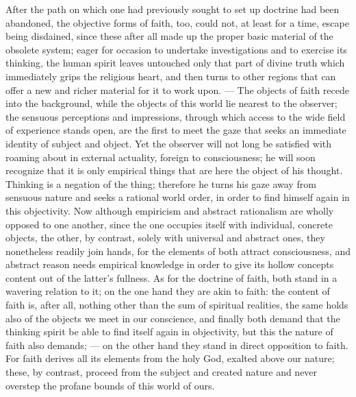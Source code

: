\documentclass[12pt]{book}
\newcommand{\opage}[1]{\marginnote{\footnotesize\textit{[#1]}}}
\begin{document}
After the path on which one had previously sought to set up doctrine had been
abandoned, the objective forms of faith, too, could not, at least for a time,
escape being disdained, since these after all made up the proper basic
material of the obsolete system; eager for occasion to undertake
investigations and to exercise its thinking, the human spirit leaves untouched
only that part of divine truth which immediately grips the religious heart,
and then turns to other regions that can offer a new and richer material for
it to work upon. --- The objects of faith recede into the background, while
the objects of this world lie nearest to the observer; the sensuous
perceptions and impressions, through
\opage{88} %
which access to the wide field of experience stands open, are the first to
meet the gaze that seeks an immediate identity of subject and object. Yet the
observer will not long be satisfied with roaming about in external actuality,
foreign to consciousness; he will soon recognize that it is only empirical
things that are here the object of his thought. Thinking is a negation of the
thing; therefore he turns his gaze away from sensuous nature and seeks a
rational world order, in order to find himself again in this objectivity. Now
although empiricism and abstract rationalism are wholly opposed to one
another, since the one occupies itself with individual, concrete objects, the
other, by contrast, solely with universal and abstract ones, they nonetheless
readily join hands, for the elements of both attract consciousness, and
abstract reason needs empirical knowledge in order to give its hollow concepts
content out of the latter's fullness. As for the doctrine of faith, both stand
in a wavering relation to it; on the one hand they are akin to faith: the
content of faith is, after all, nothing other than the sum of spiritual
realities, the same holds also of the objects we meet in our conscience, and
finally both demand that the thinking spirit be able to find itself again in
objectivity, but this the nature of faith also demands; --- on the other hand
they stand in direct opposition to faith. For faith derives all its elements
from the holy God, exalted above our nature; these, by contrast, proceed from
the subject and created nature and never overstep the profane bounds of this
world of ours.
\end{document}
